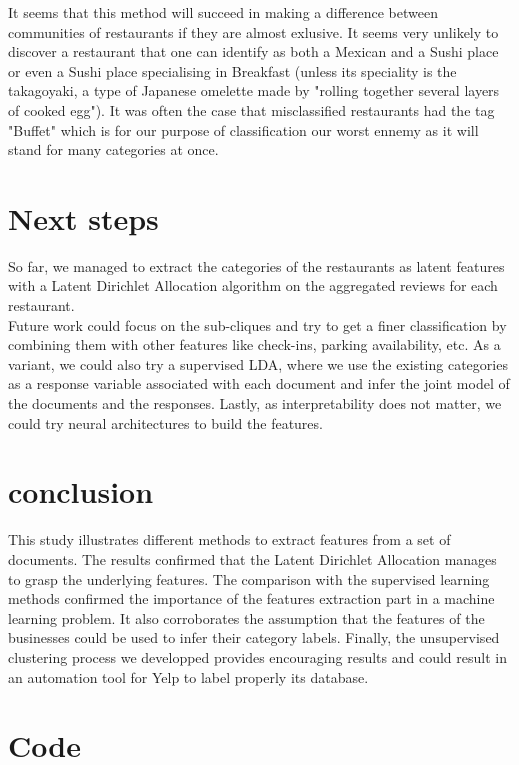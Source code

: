 \documentclass[twoside]{article}
\begin{document}
\begin{multicols}{2}
\noindent It seems that this method will succeed in making a difference between communities of restaurants if they are almost exlusive. It seems very unlikely to discover a restaurant that one can identify as both a Mexican and a Sushi place or even a Sushi place specialising in Breakfast (unless its speciality is the takagoyaki, a type of Japanese omelette made by "rolling together several layers of cooked egg"). It was often the case that misclassified restaurants had the tag "Buffet" which is for our purpose of classification our worst ennemy as it will stand for many categories at once.

\section{Next steps}

So far, we managed to extract the categories of the restaurants as latent features with a Latent Dirichlet Allocation algorithm on the aggregated reviews for each restaurant. \\

Future work could focus on the sub-cliques and try to get a finer classification by combining them with other features like check-ins, parking availability, etc. As a variant, we could also try a supervised LDA, where we use the existing categories as a response variable associated with each document and infer the joint model of the documents and the responses. Lastly, as interpretability does not matter, we could try neural architectures to build the features.


\section{conclusion}

This study illustrates different methods to extract features from a set of documents. The results confirmed that the Latent Dirichlet Allocation manages to grasp the underlying features. The comparison with the supervised learning methods confirmed the importance of the features extraction part in a machine learning problem. It also corroborates the assumption that the features of the businesses could be used to infer their category labels. Finally, the unsupervised clustering process we developped provides encouraging results and could result in an automation tool for Yelp to label properly its database. 

\section*{Code}


\end{multicols}
\end{document}
